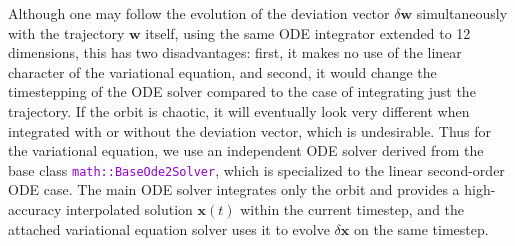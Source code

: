 \documentclass[12pt]{article}
\newcommand{\ttt}[1]{\textcolor{darkviolet}{\texttt{#1}}}
\newcommand{\bx}{\boldsymbol{x}}
\begin{document}
Although one may follow the evolution of the deviation vector $\delta\boldsymbol{w}$ simultaneously with the trajectory $\boldsymbol{w}$ itself, using the same ODE integrator extended to 12 dimensions, this has two disadvantages: first, it makes no use of the linear character of the variational equation, and second, it would change the timestepping of the ODE solver compared to the case of integrating just the trajectory. If the orbit is chaotic, it will eventually look very different when integrated with or without the deviation vector, which is undesirable. Thus for the variational equation, we use an independent ODE solver derived from the base class \ttt{math::BaseOde2Solver}, which is specialized to the linear second-order ODE case. The main ODE solver integrates only the orbit and provides a high-accuracy interpolated solution $\bx(t)$ within the current timestep, and the attached variational equation solver uses it to evolve $\delta\bx$ on the same timestep.
\end{document}
